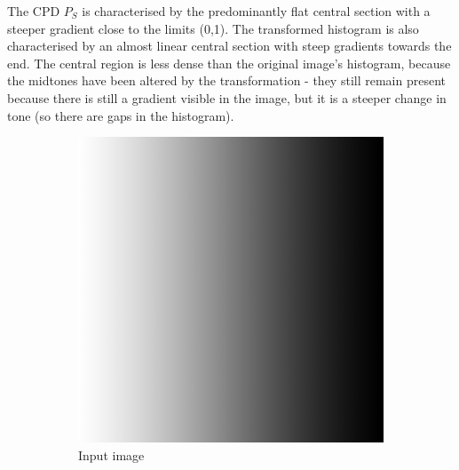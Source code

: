 \documentclass[a4paper]{article}
\begin{document}
The CPD $P_S$ is characterised by the predominantly flat central section with a steeper gradient close to the limits (0,1). The transformed histogram is also characterised by an almost linear central section with steep gradients towards the end. The central region is less dense than the original image's histogram, because the midtones have been altered by the transformation - they still remain present because there is still a gradient visible in the image, but it is a steeper change in tone (so there are gaps in the histogram).

\begin{figure}[h!]
        \centering
        \begin{subfigure}[b]{0.3\textwidth}
                \centering
                \includegraphics[width=\textwidth]{q3-beforeim.png}
                \caption{Input image}
                \label{fig:bi}
        \end{subfigure}
        \begin{subfigure}[b]{0.3\textwidth}
                \centering

\end{subfigure}
\end{figure}
\end{document}
